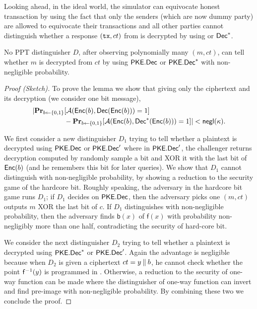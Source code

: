 Looking ahead, in the ideal world, the simulator can equivocate honest transaction by using the fact that only the senders (which are now dummy party) are allowed to equivocate their transactions and all other parties cannot distinguish whether a response $(\mathtt{tx}, ct)$ from \funcEnclave is decrypted by using \Dec or $\mathsf{Dec}^\ast$.

\begin{lemma} \label{lemma:pke-indistinguishability}
	No PPT distinguisher $D$, after observing polynomially many $(m, ct)$, can tell whether $m$ is decrypted from $ct$ by using $\mathsf{PKE}.\mathsf{Dec}$ or $\mathsf{PKE}.\mathsf{Dec}^*$ with non-negligible probability.
\end{lemma}

\begin{proof}[Proof (Sketch)]
	To prove the lemma we show that giving only the ciphertext and its decryption (we consider one bit message),
	\begin{align*}
		| \mathbf{Pr}_{b \gets \{0, 1\}} & [\mathcal{A}(\mathsf{Enc}(b), \mathsf{Dec}(\mathsf{Enc}(b))) = 1] \\&- \mathbf{Pr}_{b \gets \{0, 1\}}[ \mathcal{A}(\mathsf{Enc}(b), \mathsf{Dec}^\ast(\mathsf{Enc}(b))) = 1] | < \mathsf{negl}(\kappa).
	\end{align*}

	We first consider a new distinguisher $D_1$ trying to tell whether a plaintext is decrypted using $\mathsf{PKE}.\mathsf{Dec}$ or $\mathsf{PKE}.\mathsf{Dec}'$ where in $\mathsf{PKE}.\mathsf{Dec}'$, the challenger returns decryption computed by randomly sample a bit and XOR it with the last bit of $\mathsf{Enc}(b)$ (and he remembers this bit for later queries).
	We show that $D_1$ cannot distinguish with non-negligible probability, by showing a reduction to the security game of the hardcore bit.
	Roughly speaking, the adversary in the hardcore bit game runs $D_1$; if $D_1$ decides on $\mathsf{PKE}.\mathsf{Dec}$, then the adversary picks one $(m, ct)$ outputs $m$ XOR the last bit of $c$.
	If $D_1$ distinguishes with non-negligible probability, then the adversary finds $\mathsf{b}(x)$ of $\mathsf{f}(x)$ with probability non-negligibly more than one half, contradicting the security of hard-core bit.

	We consider the next distinguisher $D_2$ trying to tell whether a plaintext is decrypted using $\mathsf{PKE}.\mathsf{Dec}^\ast$ or $\mathsf{PKE}.\mathsf{Dec}'$.
	Again the advantage is negligible because when $D_2$ is given a ciphertext $ct = y \mathbin\Vert b$, he cannot check whether the point $\mathsf{f}^{-1}(y)$ is programmed in \funcGrpoRO.
	Otherwise, a reduction to the security of one-way function can be made where the distinguisher of one-way function can invert and find pre-image with non-negligible probability.
	By combining these two we conclude the proof.
\end{proof}


